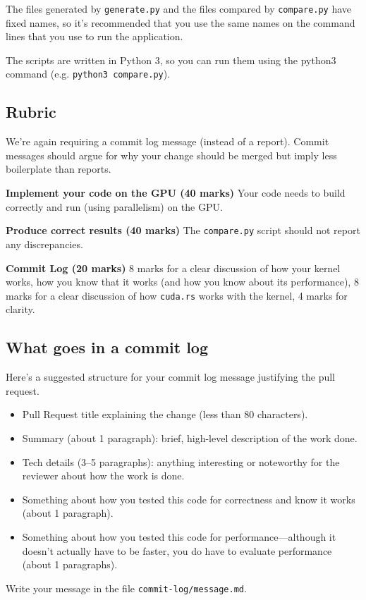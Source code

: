 The files generated by \texttt{generate.py} and the files compared by \texttt{compare.py} have fixed names, so it's recommended that you use the same names on the command lines that you use to run the application.

The scripts are written in Python 3, so you can run them using the python3 command (e.g. \texttt{python3 compare.py}).


\subsection*{Rubric }
We're again requiring a commit log message (instead of a report). Commit messages should argue for why your change should be merged but imply less boilerplate than reports.

\textbf{Implement your code on the GPU (40 marks) } Your code needs to build correctly and run (using parallelism) on the GPU.

\textbf{Produce correct results (40 marks)} The \texttt{compare.py} script should not report any discrepancies.

\textbf{Commit Log (20 marks)} 8 marks for a clear discussion of how your kernel works, how you know that it works (and how you know about its performance), 8 marks for a clear discussion of how \texttt{cuda.rs} works with the kernel, 4 marks for clarity.

\subsection*{What goes in a commit log}
Here's a suggested structure for your commit log message justifying the pull request.
\begin{itemize}
\item Pull Request title explaining the change (less than 80 characters).
\item Summary (about 1 paragraph): brief, high-level description of the work done.
\item Tech details (3--5 paragraphs): anything interesting or noteworthy for the reviewer about how the work is done. 
\item Something about how you tested this code for correctness and know it works (about 1 paragraph).
\item Something about how you tested this code for performance---although it doesn't actually have to be faster, you do have to evaluate performance (about 1 paragraphs).
\end{itemize}
Write your message in the file {\tt commit-log/message.md}.


